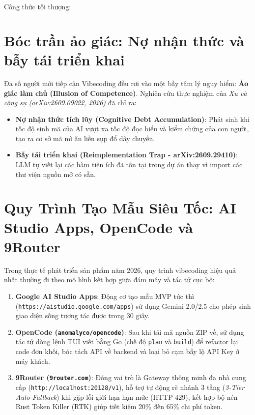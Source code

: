 \documentclass[a4paper,11pt]{report}
\begin{document}
Công thức tối thượng:
\begin{center}
\end{center}

\section{Bóc trần ảo giác: Nợ nhận thức và bẫy tái triển khai}
Đa số người mới tiếp cận Vibecoding đều rơi vào một bẫy tâm lý nguy hiểm: \textbf{Ảo giác làm chủ (Illusion of Competence)}. Nghiên cứu thực nghiệm của \textit{Xu và cộng sự (arXiv:2609.09022, 2026)} đã chỉ ra:
\begin{itemize}[leftmargin=1.5em]
    \item \textbf{Nợ nhận thức tích lũy (Cognitive Debt Accumulation)}: Phát sinh khi tốc độ sinh mã của AI vượt xa tốc độ đọc hiểu và kiểm chứng của con người, tạo ra cơ sở mã mì ăn liền sụp đổ dây chuyền.
    \item \textbf{Bẫy tái triển khai (Reimplementation Trap - arXiv:2609.29410)}: LLM tự viết lại các hàm tiện ích đã tồn tại trong dự án thay vì import các thư viện nguồn mở có sẵn.
\end{itemize}

\section{Quy Trình Tạo Mẫu Siêu Tốc: AI Studio Apps, OpenCode và 9Router}
Trong thực tế phát triển sản phẩm năm 2026, quy trình vibecoding hiệu quả nhất thường đi theo mô hình kết hợp giữa đám mây và tác tử cục bộ:
\begin{enumerate}[label={\arabic*.}]
    \item \textbf{Google AI Studio Apps}: Động cơ tạo mẫu MVP tức thì (\texttt{https://aistudio.google.com/apps}) sử dụng Gemini 2.0/2.5 cho phép sinh giao diện sống tương tác được trong 30 giây.
    \item \textbf{OpenCode (\texttt{anomalyco/opencode})}: Sau khi tải mã nguồn ZIP về, sử dụng tác tử dòng lệnh TUI viết bằng Go (chế độ \texttt{plan} và \texttt{build}) để refactor lại code đơn khối, bóc tách API về backend và loại bỏ cạm bẫy lộ API Key ở máy khách.
    \item \textbf{9Router (\texttt{9router.com})}: Đóng vai trò là Gateway thông minh đa nhà cung cấp (\texttt{http://localhost:20128/v1}), hỗ trợ tự động rẽ nhánh 3 tầng (\textit{3-Tier Auto-Fallback}) khi gặp lỗi giới hạn hạn mức (HTTP 429), kết hợp bộ nén Rust Token Killer (RTK) giúp tiết kiệm 20\% đến 65\% chi phí token.
\end{enumerate}
\end{document}
